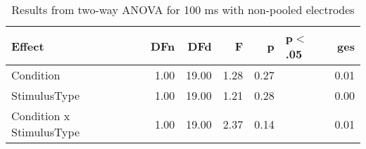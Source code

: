 \begin{table}[ht]
\centering
\begin{tabulary}{\textwidth}{lrrrrlr}
  \toprule
Effect & DFn & DFd & F & p & p$<$.05 & ges \\ 
  \midrule
Condition & 1.00 & 19.00 & 1.28 & 0.27 &  & 0.01 \\ 
  StimulusType & 1.00 & 19.00 & 1.21 & 0.28 &  & 0.00 \\ 
  Condition x StimulusType & 1.00 & 19.00 & 2.37 & 0.14 &  & 0.01 \\ 
   \bottomrule
\end{tabulary}
\caption{Results from two-way ANOVA for 100 ms with non-pooled electrodes} 
\end{table}
